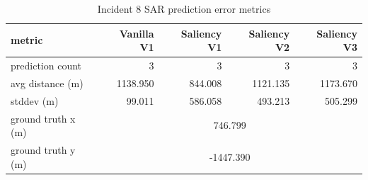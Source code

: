 \begin{table}[ht]
\centering
\caption{Incident 8 SAR prediction error metrics}
\label{tab:sar-incident-8}
\begin{tabular}{lrrrr}
\hline
metric & Vanilla V1 & Saliency V1 & Saliency V2 & Saliency V3 \\
\hline
prediction count & 3 & 3 & 3 & 3 \\
avg distance (m) & 1138.950 & 844.008 & 1121.135 & 1173.670 \\
stddev (m) & 99.011 & 586.058 & 493.213 & 505.299 \\
ground truth x (m) & \multicolumn{4}{c}{746.799} \\
ground truth y (m) & \multicolumn{4}{c}{-1447.390} \\
\hline
\end{tabular}
\end{table}
